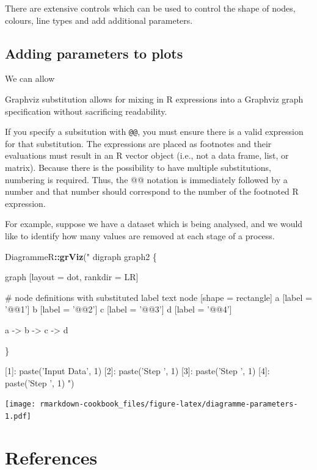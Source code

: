 \documentclass[]{book}
\newenvironment{Shaded}{\begin{snugshade}}{\end{snugshade}}
\newcommand{\KeywordTok}[1]{\textcolor[rgb]{0.13,0.29,0.53}{\textbf{#1}}}
\newcommand{\StringTok}[1]{\textcolor[rgb]{0.31,0.60,0.02}{#1}}
\newcommand{\OperatorTok}[1]{\textcolor[rgb]{0.81,0.36,0.00}{\textbf{#1}}}
\newcommand{\NormalTok}[1]{#1}
\begin{document}
There are extensive controls which can be used to control the shape of
nodes, colours, line types and add additional parameters.

\section{Adding parameters to plots}\label{adding-parameters-to-plots}

We can allow

Graphviz substitution allows for mixing in R expressions into a Graphviz
graph specification without sacrificing readability.

If you specify a subsitution with \texttt{@@}, you must ensure there is
a valid expression for that substitution. The expressions are placed as
footnotes and their evaluations must result in an R vector object (i.e.,
not a data frame, list, or matrix). Because there is the possibility to
have multiple substitutions, numbering is required. Thus, the @@
notation is immediately followed by a number and that number should
correspond to the number of the footnoted R expression.

For example, suppose we have a dataset which is being analysed, and we
would like to identify how many values are removed at each stage of a
process.

\begin{Shaded}
\begin{Highlighting}[]
\NormalTok{DiagrammeR}\OperatorTok{::}\KeywordTok{grViz}\NormalTok{(}\StringTok{"}
\StringTok{digraph graph2 \{}

\StringTok{graph [layout = dot, rankdir = LR]}

\StringTok{# node definitions with substituted label text}
\StringTok{node [shape = rectangle]}
\StringTok{a [label = '@@1']}
\StringTok{b [label = '@@2']}
\StringTok{c [label = '@@3']}
\StringTok{d [label = '@@4']}

\StringTok{a -> b -> c -> d}

\StringTok{\}}

\StringTok{[1]: paste('Input Data', 1)}
\StringTok{[2]: paste('Step ', 1)}
\StringTok{[3]: paste('Step ', 1)}
\StringTok{[4]: paste('Step ', 1)}
\StringTok{"}\NormalTok{)}
\end{Highlighting}
\end{Shaded}

\texttt{[image: rmarkdown-cookbook\_files/figure-latex/diagramme-parameters-1.pdf]}

\chapter{References}\label{references}
\end{document}
